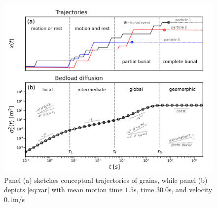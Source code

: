 \begin{figure}[!htbp]	
	\includegraphics[width=\linewidth,keepaspectratio]{./figures/ch4/diffusion.png}
	\caption{Panel (a) sketches conceptual trajectories of \DIFdelbeginFL {}\DIFdelendFL grains, while panel (b) depicts \DIFdelbeginFL {}\DIFdelendFL \DIFaddbeginFL {}\DIFaddendFL \ref{eq:var} \DIFdelbeginFL \DIFdelFL{) }\DIFdelendFL with mean motion time $1.5$s, \DIFdelbeginFL {}\DIFdelendFL \DIFaddbeginFL {}\DIFaddendFL time $30.0$s, and \DIFdelbeginFL {}\DIFdelendFL velocity $0.1$m/s\DIFdelbeginFL {}}
\end{figure}

